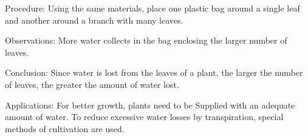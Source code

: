 \begin{multicols}{2}
\begin{description*}
\item[Procedure:]{Using the same materials, place one plastic bag around a single leaf and
another around a branch with many leaves.}
\item[Observations:]{More water collects in the bag enclosing the larger number of leaves.}
\item[Conclusion:]{Since water is lost from the leaves of a plant, the larger the number of leaves, the
greater the amount of water lost.}
\item[Applications:]{For better growth, plants need to be Supplied with an adequate amount of water.
To reduce excessive water losses by transpiration, special methods of cultivation are used.}
\end{description*}

%
%




\end{multicols}
\vfill
\pagebreak